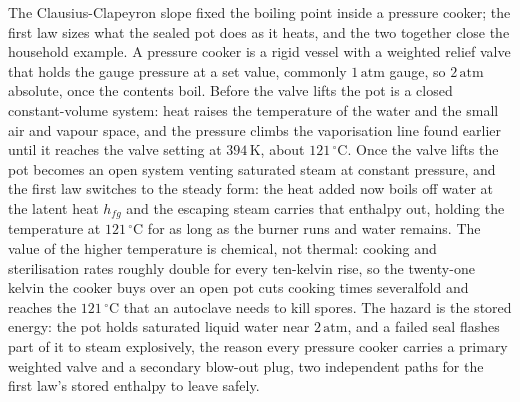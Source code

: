 The Clausius-Clapeyron slope fixed the boiling point inside a pressure cooker; the
first law sizes what the sealed pot does as it heats, and the two together close the
household example. A pressure cooker is a rigid vessel with a weighted relief valve
that holds the gauge pressure at a set value, commonly $1\,\text{atm}$ gauge, so
$2\,\text{atm}$ absolute, once the contents boil. Before the valve lifts the pot is
a closed constant-volume system: heat raises the temperature of the water and the
small air and vapour space, and the pressure climbs the vaporisation line found
earlier until it reaches the valve setting at $394\,\si{\kelvin}$, about
$121\,^{\circ}\mathrm{C}$. Once the valve lifts the pot becomes an open system
venting saturated steam at constant pressure, and the first law switches to the
steady form: the heat added now boils off water at the latent heat $h_{fg}$ and the
escaping steam carries that enthalpy out, holding the temperature at
$121\,^{\circ}\mathrm{C}$ for as long as the burner runs and water remains. The
value of the higher temperature is chemical, not thermal: cooking and sterilisation
rates roughly double for every ten-kelvin rise, so the twenty-one kelvin the cooker
buys over an open pot cuts cooking times severalfold and reaches the
$121\,^{\circ}\mathrm{C}$ that an autoclave needs to kill spores. The hazard is the
stored energy: the pot holds saturated liquid water near $2\,\text{atm}$, and a
failed seal flashes part of it to steam explosively, the reason every pressure
cooker carries a primary weighted valve and a secondary blow-out plug, two
independent paths for the first law's stored enthalpy to leave safely.

